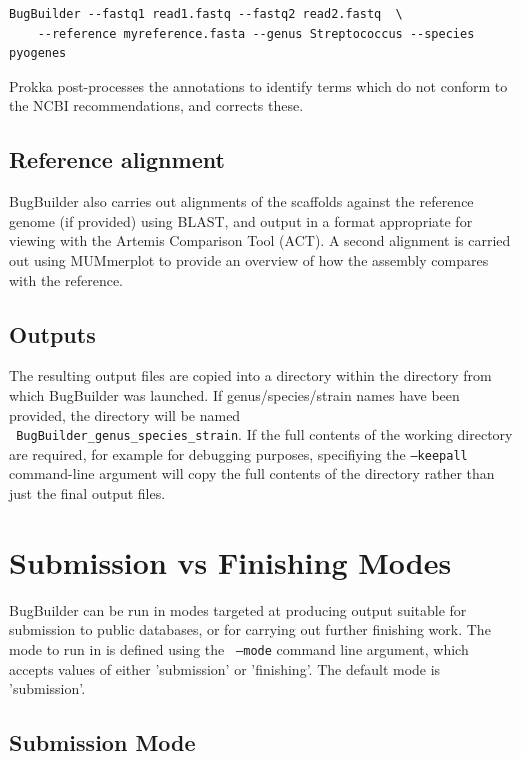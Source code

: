 \documentclass[a4paper,10pt]{article}
\begin{document}
\begin{verbatim}
BugBuilder --fastq1 read1.fastq --fastq2 read2.fastq  \
    --reference myreference.fasta --genus Streptococcus --species pyogenes
\end{verbatim}

Prokka post-processes the annotations to identify terms which do not conform to the NCBI
recommendations, and corrects these. 

\subsection{Reference alignment}

BugBuilder also carries out alignments of the scaffolds against the reference genome (if provided)
using BLAST, and output in a format appropriate for viewing with the Artemis Comparison Tool (ACT).
A second alignment is carried out using MUMmerplot to provide an overview of how the assembly
compares with the reference.  

\subsection{Outputs}

The resulting output files are copied into a directory within the directory from which BugBuilder
was launched. If genus/species/strain names have been provided, the directory will be named \\ {\tt
BugBuilder\_genus\_species\_strain}. If the full contents of the working directory are required, for
example for debugging purposes, specifiying the {\tt --keepall} command-line argument will copy the
full contents of the directory rather than just the final output files.

\section{Submission vs Finishing Modes}

BugBuilder can be run in modes targeted at producing output suitable for submission to public
databases, or for carrying out further finishing work. The mode to run in is defined using the {\tt
--mode} command line argument, which accepts values of either 'submission' or 'finishing'. The
default mode is 'submission'.

\subsection{Submission Mode}
\end{document}
